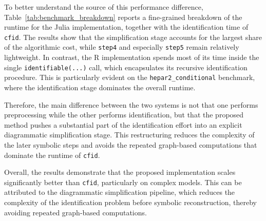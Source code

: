 \documentclass[a4paper]{report}
\begin{document}
\begin{table}[h]
\centering
{}
\caption{Stage-level runtime breakdown of the Julia implementation and comparison with the R \texttt{cfid} identification time (warm median, repeats = 30, warmups = 5). Here, Julia identify time is defined as \texttt{step4 + step5}, while R identify time corresponds to \texttt{identifiable(...)}.}
\label{tab:benchmark_breakdown}
\end{table}

To better understand the source of this performance difference,
Table~\ref{tab:benchmark_breakdown} reports a fine-grained breakdown of the runtime for the Julia implementation,
together with the identification time of \texttt{cfid}. The results show that the simplification stage accounts for the largest share of the algorithmic cost, while \texttt{step4} and especially \texttt{step5} remain relatively lightweight. In contrast, the R implementation spends most of its time inside the single \texttt{identifiable(...)} call, which encapsulates its recursive identification procedure. This is particularly evident on the \texttt{hepar2\_conditional} benchmark, where the identification stage dominates the overall runtime.

Therefore, the main difference between the two systems is not that one performs preprocessing while the other performs identification, but that the proposed method pushes a substantial part of the identification effort into an explicit diagrammatic simplification stage. This restructuring reduces the complexity of the later symbolic steps and avoids the repeated graph-based computations that dominate the runtime of \texttt{cfid}.

Overall, the results demonstrate that the proposed implementation scales significantly better than \texttt{cfid}, particularly on complex models. This can be attributed to the diagrammatic simplification pipeline, which reduces the complexity of the identification problem before symbolic reconstruction, thereby avoiding repeated graph-based computations.
\end{document}
